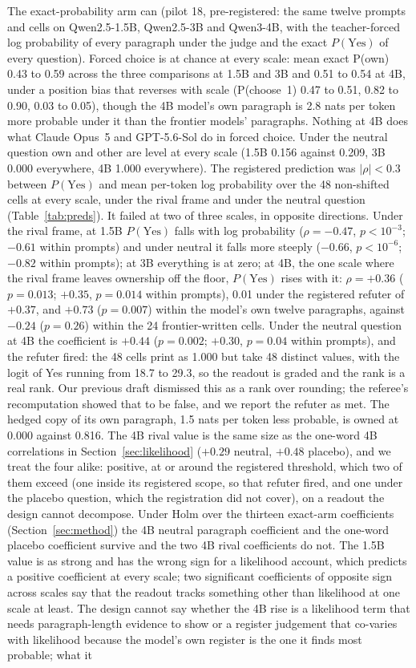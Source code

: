 \documentclass[twocolumn,10pt]{article}
\newcommand{\pyes}{P(\mathrm{Yes})}
\newcommand{\opus}{Claude Opus~5}
\newcommand{\gpt}{GPT-5.6-Sol}
\begin{document}
The exact-probability arm can (pilot 18, pre-registered: the same twelve prompts and cells on Qwen2.5-1.5B, Qwen2.5-3B and Qwen3-4B, with the teacher-forced log probability of every paragraph under the judge and the exact $\pyes$ of every question). Forced choice is at chance at every scale: mean exact P(own) 0.43 to 0.59 across the three comparisons at 1.5B and 3B and 0.51 to 0.54 at 4B, under a position bias that reverses with scale (P(choose~1) 0.47 to 0.51, 0.82 to 0.90, 0.03 to 0.05), though the 4B model's own paragraph is 2.8 nats per token more probable under it than the frontier models' paragraphs. Nothing at 4B does what \opus{} and \gpt{} do in forced choice. Under the neutral question own and other are level at every scale (1.5B 0.156 against 0.209, 3B 0.000 everywhere, 4B 1.000 everywhere). The registered prediction was $|\rho| < 0.3$ between $\pyes$ and mean per-token log probability over the 48 non-shifted cells at every scale, under the rival frame and under the neutral question (Table~\ref{tab:preds}). It failed at two of three scales, in opposite directions. Under the rival frame, at 1.5B $\pyes$ falls with log probability ($\rho=-0.47$, $p<10^{-3}$; $-0.61$ within prompts) and under neutral it falls more steeply ($-0.66$, $p<10^{-6}$; $-0.82$ within prompts); at 3B everything is at zero; at 4B, the one scale where the rival frame leaves ownership off the floor, $\pyes$ rises with it: $\rho=+0.36$ ($p=0.013$; $+0.35$, $p=0.014$ within prompts), 0.01 under the registered refuter of $+0.37$, and $+0.73$ ($p=0.007$) within the model's own twelve paragraphs, against $-0.24$ ($p=0.26$) within the 24 frontier-written cells. Under the neutral question at 4B the coefficient is $+0.44$ ($p=0.002$; $+0.30$, $p=0.04$ within prompts), and the refuter fired: the 48 cells print as 1.000 but take 48 distinct values, with the logit of Yes running from 18.7 to 29.3, so the readout is graded and the rank is a real rank. Our previous draft dismissed this as a rank over rounding; the referee's recomputation showed that to be false, and we report the refuter as met. The hedged copy of its own paragraph, 1.5 nats per token less probable, is owned at 0.000 against 0.816. The 4B rival value is the same size as the one-word 4B correlations in Section~\ref{sec:likelihood} ($+0.29$ neutral, $+0.48$ placebo), and we treat the four alike: positive, at or around the registered threshold, which two of them exceed (one inside its registered scope, so that refuter fired, and one under the placebo question, which the registration did not cover), on a readout the design cannot decompose. Under Holm over the thirteen exact-arm coefficients (Section~\ref{sec:method}) the 4B neutral paragraph coefficient and the one-word placebo coefficient survive and the two 4B rival coefficients do not. The 1.5B value is as strong and has the wrong sign for a likelihood account, which predicts a positive coefficient at every scale; two significant coefficients of opposite sign across scales say that the readout tracks something other than likelihood at one scale at least. The design cannot say whether the 4B rise is a likelihood term that needs paragraph-length evidence to show or a register judgement that co-varies with likelihood because the model's own register is the one it finds most probable; what it 
\end{document}
